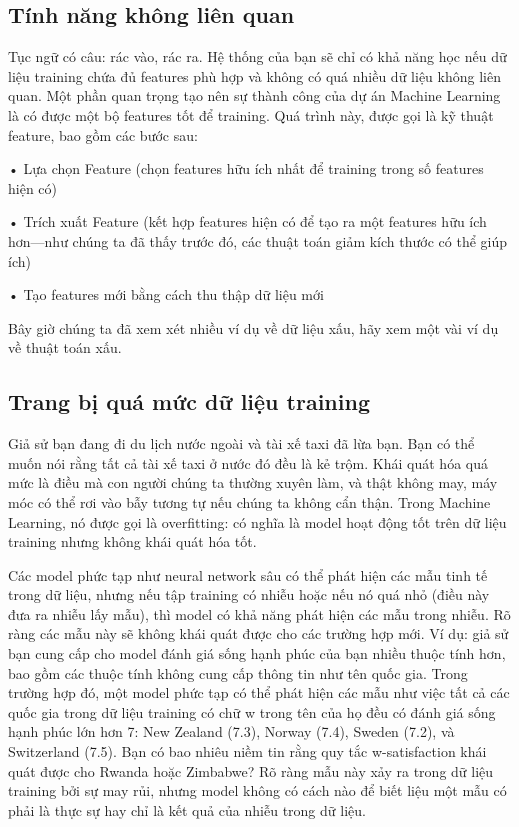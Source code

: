 \subsection{Tính năng không liên quan}

Tục ngữ có câu: rác vào, rác ra. Hệ thống của bạn sẽ chỉ có khả năng học nếu dữ liệu training chứa đủ features phù hợp và không có quá nhiều dữ liệu không liên quan. Một phần quan trọng tạo nên sự thành công của dự án Machine Learning là có được một bộ features tốt để training. Quá trình này, được gọi là kỹ thuật feature, bao gồm các bước sau:

• Lựa chọn Feature (chọn features hữu ích nhất để training trong số features hiện có)

• Trích xuất Feature (kết hợp features hiện có để tạo ra một features hữu ích hơn—như chúng ta đã thấy trước đó, các thuật toán giảm kích thước có thể giúp ích)

• Tạo features mới bằng cách thu thập dữ liệu mới

Bây giờ chúng ta đã xem xét nhiều ví dụ về dữ liệu xấu, hãy xem một vài ví dụ về thuật toán xấu.

\subsection{Trang bị quá mức dữ liệu training}

Giả sử bạn đang đi du lịch nước ngoài và tài xế taxi đã lừa bạn. Bạn có thể muốn nói rằng tất cả tài xế taxi ở nước đó đều là kẻ trộm. Khái quát hóa quá mức là điều mà con người chúng ta thường xuyên làm, và thật không may, máy móc có thể rơi vào bẫy tương tự nếu chúng ta không cẩn thận. Trong Machine Learning, nó được gọi là overfitting: có nghĩa là model hoạt động tốt trên dữ liệu training nhưng không khái quát hóa tốt.

Các model phức tạp như neural network sâu có thể phát hiện các mẫu tinh tế trong dữ liệu, nhưng nếu tập training có nhiễu hoặc nếu nó quá nhỏ (điều này đưa ra nhiễu lấy mẫu), thì model có khả năng phát hiện các mẫu trong nhiễu. Rõ ràng các mẫu này sẽ không khái quát được cho các trường hợp mới. Ví dụ: giả sử bạn cung cấp cho model đánh giá sống hạnh phúc của bạn nhiều thuộc tính hơn, bao gồm các thuộc tính không cung cấp thông tin như tên quốc gia. Trong trường hợp đó, một model phức tạp có thể phát hiện các mẫu như việc tất cả các quốc gia trong dữ liệu training có chữ w trong tên của họ đều có đánh giá sống hạnh phúc lớn hơn 7: New Zealand (7.3), Norway (7.4), Sweden (7.2), và Switzerland (7.5). Bạn có bao nhiêu niềm tin rằng quy tắc w-satisfaction khái quát được cho Rwanda hoặc Zimbabwe? Rõ ràng mẫu này xảy ra trong dữ liệu training bởi sự may rủi, nhưng model không có cách nào để biết liệu một mẫu có phải là thực sự hay chỉ là kết quả của nhiễu trong dữ liệu.

